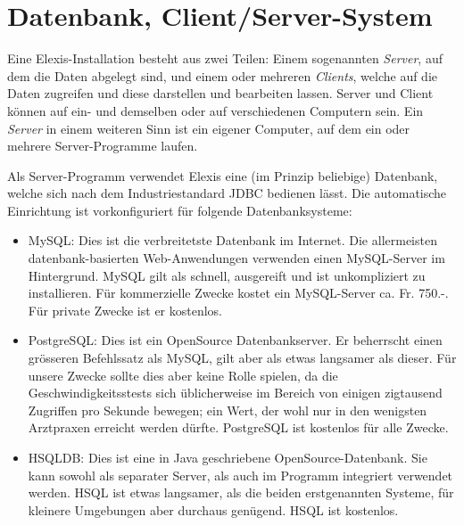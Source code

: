 
\section{Datenbank, Client/Server-System}
Eine Elexis-Installation besteht aus zwei Teilen: Einem sogenannten \textit{Server}, auf dem die Daten abgelegt sind, und einem oder mehreren \textit{Clients}, welche auf die Daten zugreifen und diese darstellen und bearbeiten lassen. Server und Client können auf ein- und demselben oder auf verschiedenen Computern sein. Ein \textit{\textit{Server}} in einem weiteren Sinn ist ein eigener Computer, auf dem ein oder mehrere Server-Programme laufen.

Als Server-Programm verwendet Elexis eine (im Prinzip beliebige) Datenbank, welche sich nach dem Industriestandard JDBC bedienen lässt. Die automatische Einrichtung ist vorkonfiguriert für folgende Datenbanksysteme:
\begin{itemize}
\item MySQL: Dies ist die verbreitetste Datenbank im Internet. Die allermeisten datenbank-basierten Web-Anwendungen verwenden
 einen MySQL-Server im Hintergrund. MySQL gilt als schnell, ausgereift und ist unkompliziert zu installieren. Für kommerzielle Zwecke kostet ein MySQL-Server ca. Fr. 750.-. Für private Zwecke ist er kostenlos.

\item PostgreSQL: Dies ist ein OpenSource Datenbankserver. Er beherrscht einen grösseren Befehlssatz als MySQL, gilt aber als etwas langsamer als dieser. Für unsere Zwecke sollte dies aber keine Rolle spielen, da die Geschwindigkeitsstests sich üblicherweise im Bereich von einigen zigtausend Zugriffen pro Sekunde bewegen; ein Wert, der wohl nur in den wenigsten Arztpraxen erreicht werden dürfte. PostgreSQL ist kostenlos für alle Zwecke.

\item HSQLDB: Dies ist eine in Java geschriebene OpenSource-Datenbank. Sie kann sowohl als separater Server, als auch im Programm integriert verwendet werden. HSQL ist etwas langsamer, als die beiden erstgenannten Systeme, für kleinere Umgebungen aber durchaus genügend. HSQL ist kostenlos.

\end{itemize}


